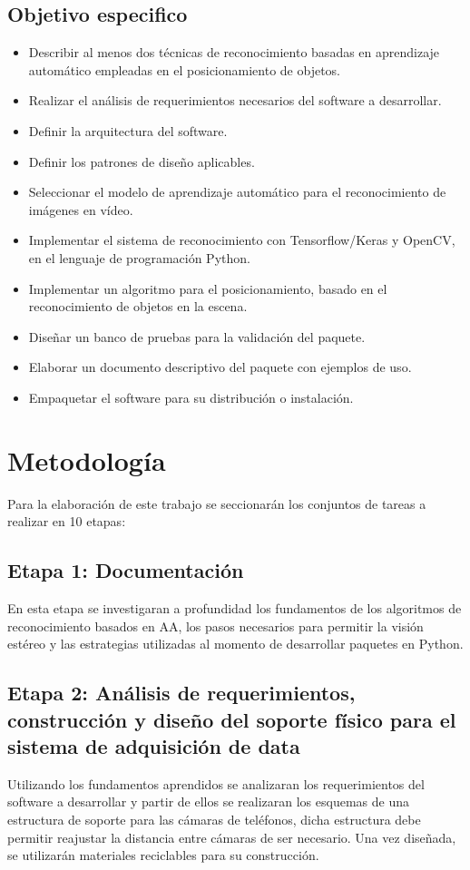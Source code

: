 \documentclass[letterpaper,titlepage,12pt,oneside,spanish,final]{report_eie}
\numberwithin{equation}{chapter}%
\numberwithin{figure}{chapter}%
\numberwithin{table}{chapter}%
\numberwithin{definition}{chapter}%
\numberwithin{lemma}{chapter}%
\numberwithin{theorem}{chapter}%
\numberwithin{corollary}{chapter}%
\numberwithin{condition}{chapter}%
\numberwithin{criterion}{chapter}%
\numberwithin{problem}{chapter}%
\numberwithin{property}{chapter}%
\numberwithin{proposition}{chapter}%
\numberwithin{solution}{chapter}%
\numberwithin{conjecture}{chapter}%
\begin{document}
\subsection*{Objetivo especifico}
\begin{itemize}
    \item Describir al menos dos técnicas de reconocimiento basadas en aprendizaje automático empleadas en el posicionamiento de objetos.
    \item Realizar el análisis de requerimientos necesarios del software a desarrollar.
    \item Definir la arquitectura del software.
    \item Definir los patrones de diseño aplicables.
    \item Seleccionar el modelo de aprendizaje automático para el reconocimiento de imágenes en vídeo.
    \item Implementar el sistema de reconocimiento con Tensorflow/Keras y OpenCV, en el lenguaje de programación Python.
    \item Implementar un algoritmo para el posicionamiento, basado en el reconocimiento de objetos en la escena.
    \item Diseñar un banco de pruebas para la validación del paquete.
    \item Elaborar un documento descriptivo del paquete con ejemplos de uso.
    \item Empaquetar el software para su distribución o instalación.
\end{itemize}
\section*{Metodología}
Para la elaboración de este trabajo se seccionarán los conjuntos de tareas a realizar en 10 etapas:
\subsection*{Etapa 1: Documentación}
En esta etapa se investigaran a profundidad los fundamentos de los algoritmos de reconocimiento basados en AA, los pasos necesarios para permitir la visión estéreo y las estrategias utilizadas al momento de desarrollar paquetes en Python.
\subsection*{Etapa 2: Análisis de requerimientos, construcción y diseño del soporte físico para el sistema de adquisición de data}
Utilizando los fundamentos aprendidos se analizaran los requerimientos del software a desarrollar y partir de ellos se realizaran los esquemas de una estructura de soporte para las cámaras de teléfonos, dicha estructura debe permitir reajustar la distancia entre cámaras de ser necesario. Una vez diseñada, se utilizarán materiales reciclables para su construcción.
\end{document}
